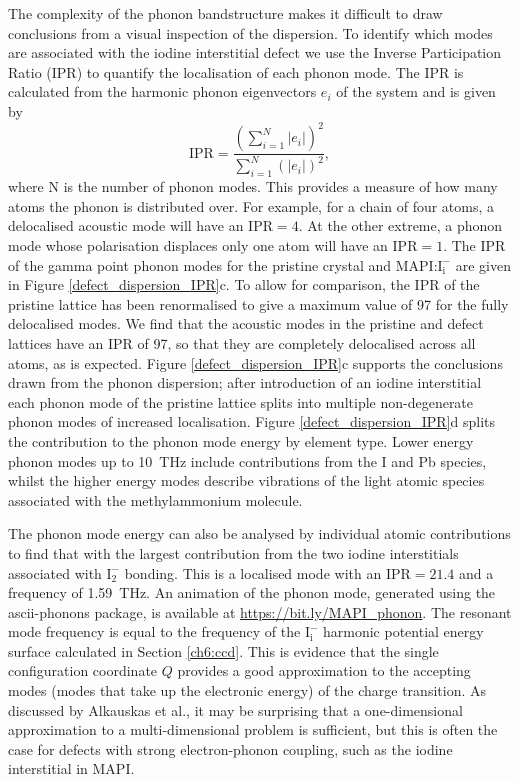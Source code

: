 The complexity of the phonon bandstructure makes it difficult to draw conclusions from a visual inspection of the dispersion.
To identify which modes are associated with the iodine interstitial defect we use the Inverse Participation Ratio (IPR) to quantify the localisation of each phonon mode. 
The IPR is calculated from the harmonic phonon eigenvectors $e_i$ of the system and is given by
\begin{equation}
\mathrm{IPR} = \frac{\left(\sum_{i=1}^N|e_i|\right)^2}{\sum_{i=1}^N\left(|e_i|\right)^2},
\end{equation}
where N is the number of phonon modes. This provides a measure of how many atoms the phonon is distributed over. For example, for a chain of four atoms, a delocalised acoustic mode will have an $\textrm{IPR}=4$. At the other extreme, a phonon mode whose polarisation displaces only one atom will have an $\textrm{IPR}=1$.
The IPR of the gamma point phonon modes for the pristine crystal and MAPI:$\mathrm{I}_\mathrm{i}^-$ are given in Figure \ref{defect_dispersion_IPR}c.
To allow for comparison, the IPR of the pristine lattice has been renormalised to give a maximum value of 97 for the fully delocalised modes.
We find that the acoustic modes in the pristine and defect lattices have an IPR of 97, so that they are completely delocalised across all atoms, as is expected.
Figure \ref{defect_dispersion_IPR}c supports the conclusions drawn from the phonon dispersion; after introduction of an iodine interstitial each phonon mode of the pristine lattice splits into multiple non-degenerate phonon modes of increased localisation.
Figure \ref{defect_dispersion_IPR}d splits the contribution to the phonon mode energy by element type. 
Lower energy phonon modes up to \SI{10}{THz} include contributions from the I and Pb species, whilst the higher energy modes describe vibrations of the light atomic species associated with the methylammonium molecule.

The phonon mode energy can also be analysed by individual atomic contributions to find that with the largest contribution from the two iodine interstitials associated with $\textrm{I}_2^-$ bonding. This is a localised mode with an $\textrm{IPR}=21.4$ and a frequency of \SI{1.59}{\tera\hertz}.
An animation of the phonon mode, generated using the ascii-phonons package,\autocite{asciiphonons} is available at \url{https://bit.ly/MAPI_phonon}.
The resonant mode frequency is equal to the frequency of the $\mathrm{I}_\mathrm{i}^-$ harmonic potential energy surface calculated in Section \ref{ch6:ccd}.
This is evidence that the single configuration coordinate $Q$ provides a good approximation to the accepting modes (modes that take up the electronic energy) of the charge transition.
As discussed by Alkauskas et al.,\autocite{Alkauskas2014} it may be surprising that a one-dimensional approximation to a multi-dimensional problem is sufficient, but this is often the case for defects with strong electron-phonon coupling, such as the iodine interstitial in MAPI.

